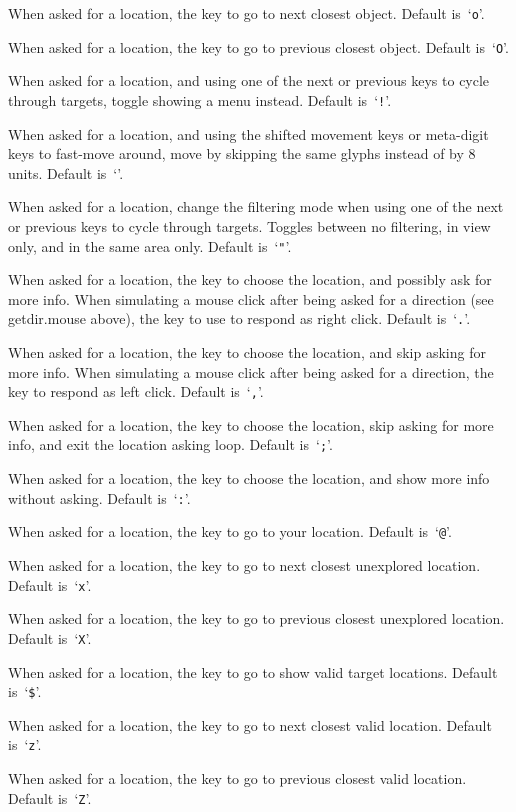 When asked for a location, the key to go to next closest object.
Default is~`{\tt o}'.
\item[{\bb{getpos.obj.prev}}]
When asked for a location, the key to go to previous closest object.
Default is~`{\tt O}'.
\item[{\bb{getpos.menu}}]
When asked for a location, and using one of the next or previous keys to
cycle through targets, toggle showing a menu instead. Default is~`{\tt !}'.
\item[{\bb{getpos.moveskip}}]
When asked for a location, and using the shifted movement keys or
meta-digit keys to fast-move around, move by skipping the same glyphs
instead of by 8 units.
Default is~`{\tt *}'.
\item[{\bb{getpos.filter}}]
When asked for a location, change the filtering mode when using one of
the next or previous keys to cycle through targets. Toggles between no
filtering, in view only, and in the same area only. Default is~`{\tt "}'.
\item[{\bb{getpos.pick}}]
When asked for a location, the key to choose the location, and possibly
ask for more info.
When simulating a mouse click after being asked for a direction (see
getdir.mouse above), the key to use to respond as right click.
Default is~`{\tt .}'.
\item[{\bb{getpos.pick.once}}]
When asked for a location, the key to choose the location, and skip
asking for more info.
When simulating a mouse click after being asked for a direction,
the key to respond as left click.
Default is~`{\tt ,}'.
\item[{\bb{getpos.pick.quick}}]
When asked for a location, the key to choose the location, skip asking
for more info, and exit the location asking loop. Default is~`{\tt ;}'.
\item[{\bb{getpos.pick.verbose}}]
When asked for a location, the key to choose the location, and show more
info without asking. Default is~`{\tt :}'.
\item[{\bb{getpos.self}}]
When asked for a location, the key to go to your location.
Default is~`{\tt @}'.
\item[{\bb{getpos.unexplored.next}}]
When asked for a location, the key to go to next closest unexplored location.
Default is~`{\tt x}'.
\item[{\bb{getpos.unexplored.prev}}]
When asked for a location, the key to go to previous closest unexplored
location. Default is~`{\tt X}'.
\item[{\bb{getpos.valid}}]
When asked for a location, the key to go to show valid target locations.
Default is~`{\tt \$}'.
\item[{\bb{getpos.valid.next}}]
When asked for a location, the key to go to next closest valid location.
Default is~`{\tt z}'.
\item[{\bb{getpos.valid.prev}}]
When asked for a location, the key to go to previous closest valid location.
Default is~`{\tt Z}'.
\elist


